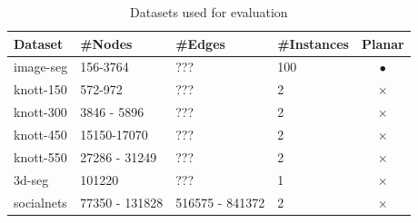 \documentclass[10pt,twocolumn,letterpaper]{article}
\begin{document}
\begin{table}[H]
   \tiny
   \centering
   \caption{Datasets used for evaluation}
   \label{tab:instance_sizes}
   \begin{tabular}{llllc}
      \toprule
         Dataset          &     \#Nodes     & \#Edges  & \#Instances  & Planar        \\ 
      \midrule 
         image-seg        &     156-3764        & ???              & 100          & $\bullet$    \\ 
         knott-150        &     572-972         & ???              & 2            & $\times$ \\
         knott-300        &     3846 - 5896     & ???              & 2            & $\times$ \\
         knott-450        &     15150-17070     & ???              & 2            & $\times$ \\
         knott-550        &     27286 - 31249   & ???              & 2            & $\times$ \\
         3d-seg           &     101220          & ???              & 1            & $\times$ \\
         socialnets       &     77350 - 131828  & 516575 - 841372  & 2            & $\times$ \\  
      \bottomrule
   \end{tabular}
\end{table}
\end{document}
